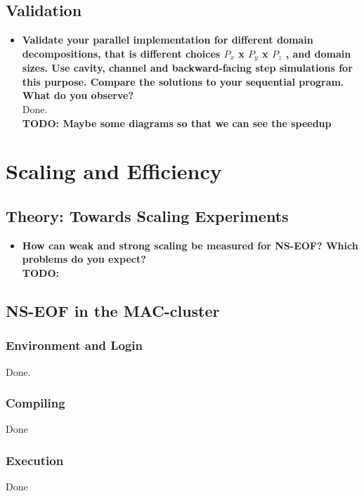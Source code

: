 \documentclass[a4paper]{article}
\newcommand{\td}[1]{
	\textbf{\color{red}TODO: {#1}}
}
\begin{document}
\subsection{Validation}
\begin{itemize}
	\item \textbf{Validate your parallel implementation for different domain decompositions, that is different choices $P_x$ x $P_y$ x $P_z$ , and domain sizes. Use cavity, channel and backward-facing step simulations for this purpose. Compare the solutions to your sequential program. What do you observe?}\\
	Done.\\
	\td{Maybe some diagrams so that we can see the speedup}
	
\end{itemize}

\section{Scaling and Efficiency}
\subsection{Theory: Towards Scaling Experiments}
\begin{itemize}
	\item \textbf{How can weak and strong scaling be measured for NS-EOF? Which problems do you expect?}\\
	\td{}
\end{itemize}
\subsection{NS-EOF in the MAC-cluster}
\subsubsection{Environment and Login}
Done.
\subsubsection{Compiling}
Done
\subsubsection{Execution}
Done
\end{document}
